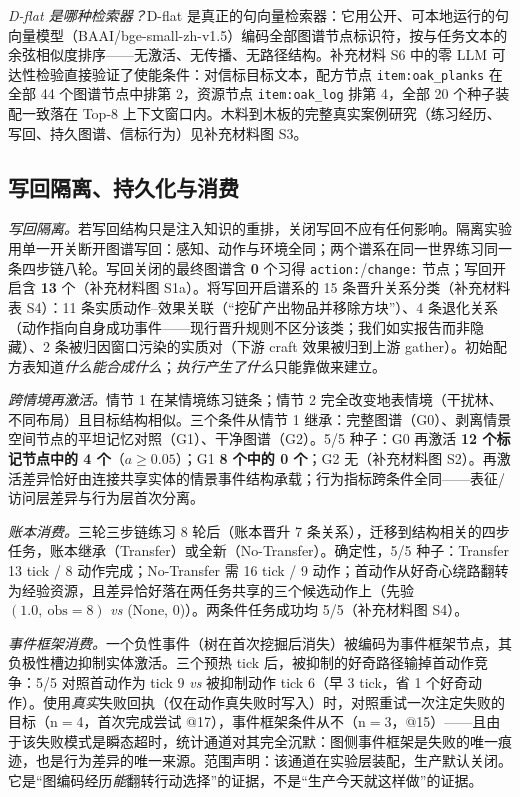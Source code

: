 \documentclass[10pt,a4paper]{ctexart}
\begin{document}
\emph{D-flat 是哪种检索器？}D-flat 是真正的句向量检索器：它用公开、可本地运行的句向量模型（BAAI/bge-small-zh-v1.5）编码全部图谱节点标识符，按与任务文本的余弦相似度排序——无激活、无传播、无路径结构。补充材料 S6 中的零 LLM 可达性检验直接验证了使能条件：对信标目标文本，配方节点 \texttt{item:oak\_planks} 在全部 44 个图谱节点中排第 2，资源节点 \texttt{item:oak\_log} 排第 4，全部 20 个种子装配一致落在 Top-8 上下文窗口内。木料到木板的完整真实案例研究（练习经历、写回、持久图谱、信标行为）见补充材料图 S3。

\subsection{写回隔离、持久化与消费}
\label{sec:res-persist}

\emph{写回隔离。}若写回结构只是注入知识的重排，关闭写回不应有任何影响。隔离实验用单一开关断开图谱写回：感知、动作与环境全同；两个谱系在同一世界练习同一条四步链八轮。写回关闭的最终图谱含 \textbf{0} 个习得 \texttt{action:}/\texttt{change:} 节点；写回开启含 \textbf{13} 个（补充材料图 S1a）。将写回开启谱系的 15 条晋升关系分类（补充材料表 S4）：11 条实质动作--效果关联（“挖矿产出物品并移除方块”）、4 条退化关系（动作指向自身成功事件——现行晋升规则不区分该类；我们如实报告而非隐藏）、2 条被归因窗口污染的实质对（下游 craft 效果被归到上游 gather）。初始配方表知道\emph{什么能合成什么}；\emph{执行产生了什么}只能靠做来建立。

\emph{跨情境再激活。}情节 1 在某情境练习链条；情节 2 完全改变地表情境（干扰林、不同布局）且目标结构相似。三个条件从情节 1 继承：完整图谱（G0）、剥离情景空间节点的平坦记忆对照（G1）、干净图谱（G2）。5/5 种子：G0 再激活 \textbf{12 个标记节点中的 4 个}（$a\ge0.05$）；G1 \textbf{8 个中的 0 个}；G2 无（补充材料图 S2）。再激活差异恰好由连接共享实体的情景事件结构承载；行为指标跨条件全同——表征/访问层差异与行为层首次分离。

\emph{账本消费。}三轮三步链练习 8 轮后（账本晋升 7 条关系），迁移到结构相关的四步任务，账本继承（Transfer）或全新（No-Transfer）。确定性，5/5 种子：Transfer 13 tick / 8 动作完成；No-Transfer 需 16 tick / 9 动作；首动作从好奇心绕路翻转为经验资源，且差异恰好落在两任务共享的三个候选动作上（先验 $(1.0,\ \text{obs}{=}8)$ \emph{vs} (None, 0)）。两条件任务成功均 5/5（补充材料图 S4）。

\emph{事件框架消费。}一个负性事件（树在首次挖掘后消失）被编码为事件框架节点，其负极性槽边抑制实体激活。三个预热 tick 后，被抑制的好奇路径输掉首动作竞争：5/5 对照首动作为 tick 9 \emph{vs} 被抑制动作 tick 6（早 3 tick，省 1 个好奇动作）。使用\emph{真实}失败回执（仅在动作真失败时写入）时，对照重试一次注定失败的目标（n$=$4，首次完成尝试 @17），事件框架条件从不（n$=$3，@15）——且由于该失败模式是瞬态超时，统计通道对其完全沉默：图侧事件框架是失败的唯一痕迹，也是行为差异的唯一来源。范围声明：该通道在实验层装配，生产默认关闭。它是“图编码经历\emph{能}翻转行动选择”的证据，不是“生产今天就这样做”的证据。
\end{document}
